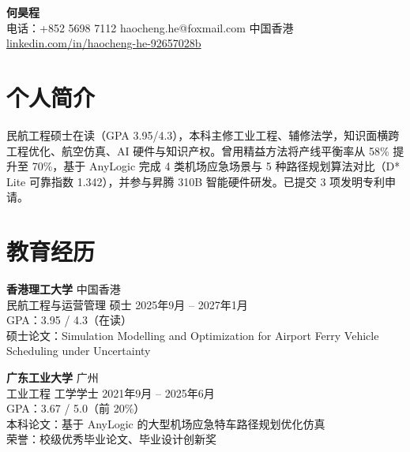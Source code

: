 \documentclass[10pt,a4paper]{article}
\begin{document}
\begin{center}
  {\large\bfseries 何昊程} \\[2pt]
  电话：+852 5698 7112 \enspace\textbar\enspace
  haocheng.he@foxmail.com \enspace\textbar\enspace
  中国香港 \\
  \href{https://linkedin.com/in/haocheng-he-92657028b}{linkedin.com/in/haocheng-he-92657028b}
\end{center}

\section{个人简介}
民航工程硕士在读（GPA 3.95/4.3），本科主修工业工程、辅修法学，知识面横跨工程优化、航空仿真、AI 硬件与知识产权。曾用精益方法将产线平衡率从 58\% 提升至 70\%，基于 AnyLogic 完成 4 类机场应急场景与 5 种路径规划算法对比（D* Lite 可靠指数 1.342），并参与昇腾 310B 智能硬件研发。已提交 3 项发明专利申请。

\section{教育经历}

\textbf{香港理工大学} \hfill 中国香港 \\
{\small 民航工程与运营管理 硕士} \hfill 2025年9月 -- 2027年1月 \\
{\small GPA：3.95 / 4.3（在读）} \\
{\small 硕士论文：Simulation Modelling and Optimization for Airport Ferry Vehicle Scheduling under Uncertainty}

\vspace{3pt}

\textbf{广东工业大学} \hfill 广州 \\
{\small 工业工程 工学学士} \hfill 2021年9月 -- 2025年6月 \\
{\small GPA：3.67 / 5.0（前 20\%）} \\
{\small 本科论文：基于 AnyLogic 的大型机场应急特车路径规划优化仿真} \\
{\small 荣誉：校级优秀毕业论文、毕业设计创新奖}
\end{document}
